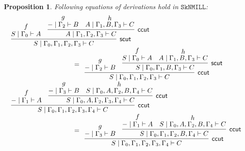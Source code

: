 \documentclass[sn-mathphys-num]{sn-jnl}%
\newcommand{\GG}{\Gamma}
\newcommand{\vd}{\vdash}
\newcommand{\SkNMILL}{$\mathtt{SkNMILL}$}
\newcommand{\mf}[1]{\mathsf{#1}}
\theoremstyle{thmstyleone}%
\newtheorem{proposition}[theorem]{Proposition}%
\theoremstyle{thmstyletwo}%
\theoremstyle{thmstylethree}%
\begin{document}
\begin{proposition}\label{eq:cut}
  Following equations of derivations hold in \SkNMILL\textnormal{:}
    \begin{displaymath}
      \begin{array}{l}
      \begin{array}{c}
        \infer[\mf{scut}]{S \mid \GG_0, \GG_1 , \GG_2 , \GG_3 \vd C}{
          \deduce{S \mid \GG_0 \vd A}{f}
          &
          \infer[\mf{ccut}]{A \mid \GG_1 , \GG_2 , \GG_3 \vd C}{
            \deduce{{-} \mid \GG_2 \vd B}{g}
            &
            \deduce{A \mid \GG_1 , B , \GG_3 \vd C}{h}
          }
        }
      \end{array}
      \\[10pt]
        \qquad \qquad \qquad \qquad \qquad  =
        \begin{array}{c}
          \infer[\mf{ccut}]{S \mid \GG_0, \GG_1 , \GG_2 , \GG_3 \vd C}{
          \deduce{{-} \mid \GG_2 \vd B}{g}
          &
          \infer[\mf{scut}]{S \mid \GG_0 , \GG_1 , B , \GG_3 \vd C}{
            \deduce{S \mid \GG_0 \vd A}{f}
            &
            \deduce{A \mid \GG_1 , B , \GG_3 \vd C}{h}
          }
        }
        \end{array}
        \\[20pt]
      \begin{array}{c}
        \infer[\mf{ccut}]{S \mid \GG_0 , \GG_1 , \GG_2 , \GG_3 , \GG_4 \vd C}{
          \deduce{{-} \mid \GG_1 \vd A}{f}
          &
          \infer[\mf{ccut}]{S \mid \GG_0 , A , \GG_2 , \GG_3 , \GG_4 \vd C}{
            \deduce{{-} \mid \GG_3 \vd B}{g}
            &
            \deduce{S \mid \GG_0 , A , \GG_2 , B , \GG_4 \vd C}{h}
          }
        }
      \end{array}
      \\[10pt]
      \qquad \qquad \qquad \qquad \qquad  =
      \begin{array}{c}
        \infer[\mf{ccut}]{S \mid \GG_0 , \GG_1 , \GG_2 , \GG_3 , \GG_4 \vd C}{
          \deduce{{-} \mid \GG_3 \vd B}{g}
          &
          \infer[\mf{ccut}]{S \mid \GG_0 , \GG_1 , \GG_2 , B , \GG_4 \vd C}{
            \deduce{{-} \mid \GG_1 \vd A}{f}
            &
            \deduce{S \mid \GG_0 , A , \GG_2 , B , \GG_4 \vd C}{h}
          }
        }
      \end{array}
      \\[30pt]
      \end{array}
    \end{displaymath}
    \begin{displaymath}

\end{displaymath}
\end{proposition}
\end{document}
